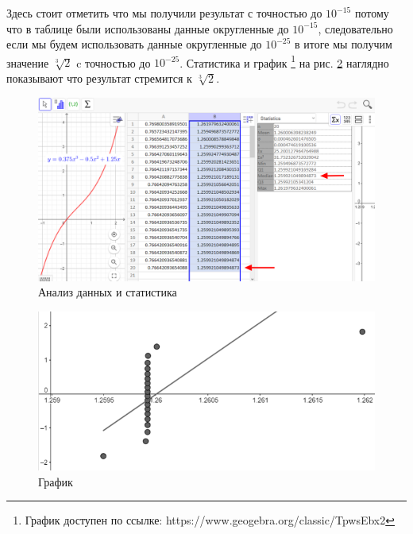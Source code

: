 \documentclass[12pt, letterpaper, oneside]{report}
\begin{document}
Здесь стоит отметить что мы получили результат с точностью до $10^{-15}$ потому что в таблице были использованы данные округленные до $10^{-15}$, следовательно если мы будем использовать данные округленные до $10^{-25}$ в итоге мы получим значение $\sqrt[3]{2}$ c точностью до $10^{-25}$. Статистика и график \footnote{График доступен по ссылке:  https://www.geogebra.org/classic/TpwsEbx2} на рис. \ref{fig:plot} наглядно показывают  что результат стремится к $\sqrt[3]{2}$.
\\
\begin{figure}[h]
	\centering
	\includegraphics[width=0.88\linewidth]{images/Table_arrow.png}
	\caption{Анализ данных и статистика}
	\label{fig:data}
\end{figure}
\begin{figure}[h]
	\centering
	\includegraphics[width=0.68\linewidth]{images/plot.png}
	\caption{График}
	\label{fig:plot}
\end{figure}
\newpage
\end{document}
